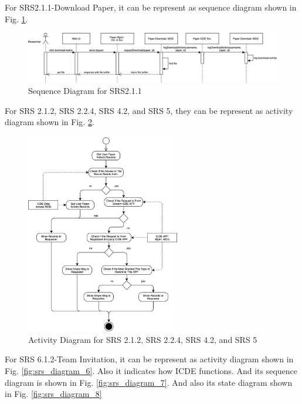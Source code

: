 For SRS2.1.1-Download Paper, it can be represent as sequence diagram shown in Fig. \ref{fig:srs_diagram_4}.

\begin{figure}[t]
	\centering
	\includegraphics[width=1\textwidth]{./img/srs_diagram_4.png}
	\caption{Sequence Diagram for SRS2.1.1}
	
	\label{fig:srs_diagram_4}
\end{figure}


For SRS 2.1.2, SRS 2.2.4, SRS 4.2, and SRS 5, they can be represent as activity diagram shown in Fig. \ref{fig:srs_diagram_5}.

\begin{figure}[t]
	\centering
	\includegraphics[width=0.6\textwidth]{./img/srs_diagram_5.png}
	\caption{Activity Diagram for SRS 2.1.2, SRS 2.2.4, SRS 4.2, and SRS 5}
	
	\label{fig:srs_diagram_5}
\end{figure}

For SRS 6.1.2-Team Invitation, it can be represent as activity diagram shown in Fig. \ref{fig:srs_diagram_6}. 
Also it indicates how ICDE functions. And its sequence diagram is shown in Fig. \ref{fig:srs_diagram_7}. 
And also its state diagram shown in Fig. \ref{fig:srs_diagram_8}

